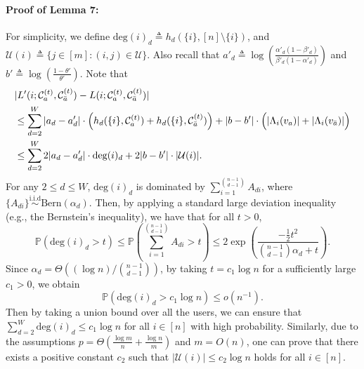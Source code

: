 \documentclass{article}
\newcommand\af{\alpha_d}
\begin{document}
\paragraph{Proof of Lemma 7:} For simplicity, we define $\text{deg}(i)_d \triangleq h_d(\{i\}, [n] \setminus \{i\})$, and $\mathcal{U}(i) \triangleq \{ j \in [m]: (i,j) \in \mathcal{U} \}$. Also recall that  $a'_d \triangleq \log \left( \frac{\alpha'_d (1-\beta'_d)}{\beta'_d (1-\alpha'_d)} \right)$ and $b' \triangleq \log \left( \frac{1-\theta'}{\theta'} \right)$.  Note that
    \begin{equation}\label{s612}
    \begin{aligned}
    & |L'(i; \mathcal{C}^{(t)}_a, \mathcal{C}^{(t)}_{\Bar{a}}) - L(i; \mathcal{C}^{(t)}_a, \mathcal{C}^{(t)}_{\Bar{a}})| \\
    & \leq \sum_{d=2}^{W} | a_d - a'_d | \cdot \Big( h_d(\{i\}, \mathcal{C}^{(t)}_a) + h_d(\{i\}, \mathcal{C}^{(t)}_{\Bar{a}}) \Big)  + |b - b'| \cdot \Big( |\Lambda_i(v_{a})| + |\Lambda_i(v_{\Bar{a}})| \Big) \\
    &\leq \sum_{d=2}^{W} 2 | a_d - a'_d | \cdot  \text{deg}(i)_d  + 2|b - b' |\cdot |\mathcal{U}(i)|.
    \end{aligned}
    \end{equation}
For any $2 \le d\le W$, $\text{deg}(i)_d$ is dominated by $\sum_{i=1}^{\binom{n-1}{d-1}} A_{di}$, where $\{A_{di}\}\overset{\text{i.i.d}}{\sim}\text{Bern}(\af)$. Then, by applying a standard large deviation inequality (e.g., the Bernstein's inequality), we have that  for all $t > 0$,
	\begin{equation}\label{s613}
		\mathbb{P}(\text{deg}(i)_d > t) \leq \mathbb{P}\left( \sum_{i=1}^{\binom{n-1}{d-1}} A_{di} > t \right) \leq 2\exp \left( \frac{-\frac{1}{2} t^2}{\binom{n-1}{d-1} \af + t} \right).
	\end{equation}
	Since $\af = \Theta \left( (\log n)/\binom{n-1}{d -1} \right)$, by taking $t = c_1 \log n$ for a sufficiently large $c_1>0$, we obtain 
	$$
	\mathbb{P}\left(\text{deg}(i)_d > c_1 \log n\right) \leq o(n^{-1}).
	$$ 
	Then by taking a union bound over all the users, we can ensure that $\sum_{d=2}^{W} \text{deg}(i)_d \leq c_1 \log n$ for all $i \in [n]$ with high probability. 
	Similarly, due to the assumptions $p=\Theta\left( \frac{\log m}{n} + \frac{\log n}{m} \right)$ and $m=O(n)$, one can prove that there exists a positive constant $c_2$ such that $|\mathcal{U}(i)|\leq c_2 \log n$ holds for all  $i \in [n]$.
	
\end{document}
